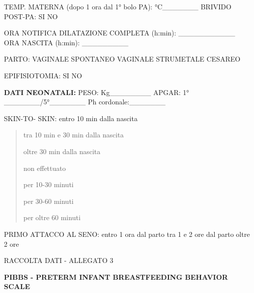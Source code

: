 \documentclass[]{article}
\begin{document}
TEMP. MATERNA (dopo 1 ora dal 1° bolo PA): °C\_\_\_\_\_\_\_ BRIVIDO
POST-PA: SI NO

ORA NOTIFICA DILATAZIONE COMPLETA (h:min): \_\_\_\_\_\_\_\_\_\_\_ ORA
NASCITA (h:min): \_\_\_\_\_\_\_\_\_

PARTO: VAGINALE SPONTANEO VAGINALE STRUMETALE CESAREO

EPIFISIOTOMIA: SI NO

\textbf{DATI NEONATALI:} PESO: Kg\_\_\_\_\_\_\_\_ APGAR: 1°
\_\_\_\_\_\_\_/5°\_\_\_\_\_\_\_ Ph cordonale:\_\_\_\_\_\_\_

SKIN-TO- SKIN: entro 10 min dalla nascita

\begin{quote}
tra 10 min e 30 min dalla nascita

oltre 30 min dalla nascita

non effettuato

per 10-30 minuti

per 30-60 minuti

per oltre 60 minuti
\end{quote}

{PRIMO ATTACCO AL SENO: entro 1 ora dal parto tra 1 e 2 ore dal parto
oltre 2 ore}

{RACCOLTA DATI - ALLEGATO 3 }

\textbf{PIBBS - PRETERM INFANT BREASTFEEDING BEHAVIOR SCALE }
\end{document}
